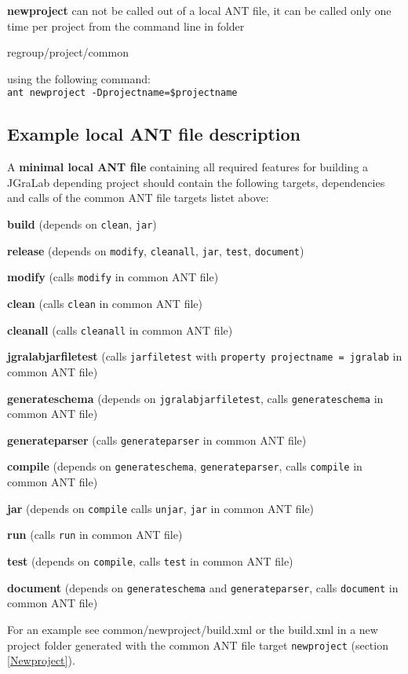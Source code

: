 \documentclass
[
		a4paper,
		twoside, 										
		BCOR10mm,											
		11pt,												
		halfparskip,								
		bigheadings,								
		notitlepage,			
		pdftex											
]
{scrartcl}
\begin{document}
\textbf{newproject} can not be called out of a local ANT file, it can be called only one time per project from the command line in folder
\footnotesize
\begin{compactitem}
	\item regroup/project/common
\end{compactitem}
\normalsize
using the following command:\\
\footnotesize
\verb|ant newproject -Dprojectname=$projectname|
\normalsize



\subsection{Example local ANT file description}
\label{ExampleLocalANTFileDescription}

A \textbf{minimal local ANT file} containing all required features for building a JGraLab depending project should contain the following targets, dependencies and calls of the common ANT file targets listet above:
\begin{compactitem}
	\item \textbf{build} (depends on \texttt{clean}, \texttt{jar})
	\item \textbf{release} (depends on \texttt{modify}, \texttt{cleanall}, \texttt{jar}, \texttt{test}, \texttt{document})
	\item \textbf{modify} (calls \texttt{modify} in common ANT file)
	\item \textbf{clean} (calls \texttt{clean} in common ANT file)
	\item \textbf{cleanall} (calls \texttt{cleanall} in common ANT file)
	\item \textbf{jgralabjarfiletest} (calls \texttt{jarfiletest} with \texttt{property projectname = jgralab} in common ANT file)
	\item \textbf{generateschema} (depends on \texttt{jgralabjarfiletest}, calls \texttt{generate\-schema} in common ANT file)
	\item \textbf{generateparser} (calls \texttt{generateparser} in common ANT file)
	\item \textbf{compile} (depends on \texttt{generateschema}, \texttt{generateparser}, calls \texttt{compile} in common ANT file)
	\item \textbf{jar} (depends on \texttt{compile} calls \texttt{unjar}, \texttt{jar} in common ANT file)
	\item \textbf{run} (calls \texttt{run} in common ANT file)
	\item \textbf{test} (depends on \texttt{compile}, calls \texttt{test} in common ANT file)
	\item \textbf{document} (depends on \texttt{generateschema} and \texttt{generateparser}, calls \texttt{document} in common ANT file)
\end{compactitem}
For an example see common/newproject/build.xml or the build.xml in a new project folder generated with the common ANT file target \texttt{newproject} (section \ref{Newproject}).
\end{document}
